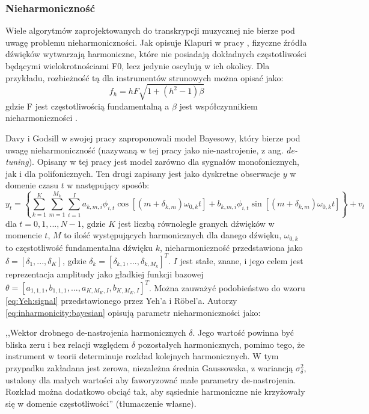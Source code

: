 \documentclass[12pt,a4paper,twoside]{mwart}
\begin{document}
\subsubsection{Nieharmoniczność} \label{sec:multif0:inh:model}
Wiele algorytmów zaprojektowanych do transkrypcji muzycznej nie bierze pod uwagę problemu nieharmoniczności. Jak opisuje Klapuri w pracy \cite[806-808]{Transcription:Klapuri:MultipleFundamentalFrequencyEstimation}, fizyczne źródła dźwięków wytwarzają harmoniczne, które nie posiadają dokładnych częstotliwości będącymi wielokrotnościami F0, lecz jedynie oscylują w ich okolicy. Dla przykładu, rozbieżność tą dla instrumentów strunowych można opisać jako:
\begin{equation}\label{eq:inharmonicity:strings}
  f_h = hF \sqrt{1 + (h^2 - 1) \beta}
\end{equation}
gdzie F jest częstotliwością fundamentalną a $\beta$ jest współczynnikiem nieharmoniczności \cite[807]{Transcription:Klapuri:MultipleFundamentalFrequencyEstimation}.

Davy i Godsill w swojej pracy \cite[1-10]{Transcription:BayesianHarmonicModels} zaproponowali model Bayesowy, który bierze pod uwagę nieharmoniczność (nazywaną w tej pracy jako nie-nastrojenie, z ang. \textit{de-tuning}). Opisany w tej pracy jest model zarówno dla sygnałów monofonicznych, jak i dla polifonicznych. Ten drugi zapisany jest jako dyskretne obserwacje $y$ w domenie czasu $t$ w następujący sposób:
\begin{equation}\label{eq:inharmonicity:bayesian}
  y_t = \left\{ \sum_{k=1}^{K}\sum_{m=1}^{M_k}\sum_{i=1}^{I} a_{k,m,i} \phi_{i,t}\cos[(m + \delta_{k,m})\omega_{0,k}t] + b_{k,m,i}\phi_{i,t}\sin[(m + \delta_{k,m})\omega_{0,k}t]\right\} + v_t
\end{equation}
dla $t = 0,1,...,N-1$, gdzie $K$ jest liczbą równolegle granych dźwięków w momencie $t$, $M$ to ilość występujących harmonicznych dla danego dźwięku, $\omega_{0,k}$ to częstotliwość fundamentalna dźwięku $k$, nieharmoniczność przedstawiona jako $\delta = [\delta_1, ..., \delta_K]$, gdzie $\delta_k = [\delta_{k,1}, ..., \delta_{k, M_{k}}]^T$. $I$ jest stałe, znane, i jego celem jest reprezentacja amplitudy jako gładkiej funkcji bazowej $\theta = [a_{1,1,1}, b_{1,1,1}, ..., a_{K, M_{K},I}, b_{K, M_{K},I}]^T$. Można zauważyć podobieństwo do wzoru  \ref{eq:Yeh:signal} przedstawionego przez Yeh'a i Röbel'a. Autorzy \ref{eq:inharmonicity:bayesian} opisują parametr nieharmoniczności jako:
\begin{displayquote}
,,Wektor drobnego de-nastrojenia harmonicznych $\delta$. Jego wartość powinna być bliska zeru i bez relacji względem $\delta$ pozostałych harmonicznych, pomimo tego, że instrument w teorii determinuje rozkład kolejnych harmonicznych. W tym przypadku zakładana jest zerowa, niezależna średnia Gaussowska, z wariancją $\sigma_{\delta}^{2}$, ustalony dla małych wartości aby faworyzować małe parametry de-nastrojenia. Rozkład można dodatkowo obciąć tak, aby sąsiednie harmoniczne nie krzyżowały się w domenie częstotliwości'' \cite[9]{Transcription:BayesianHarmonicModels}(tłumaczenie własne).
\end{displayquote}
\end{document}
